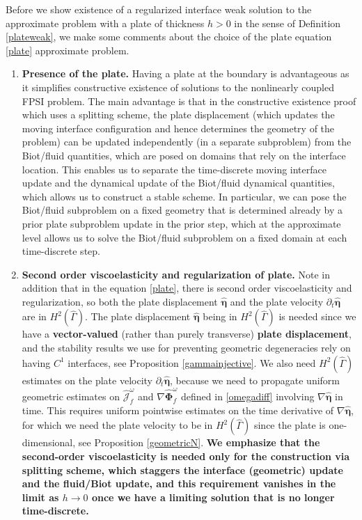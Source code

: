 \documentclass[11pt]{article}
\newcommand{\bd}{\boldsymbol}
\theoremstyle{definition}
\begin{document}
Before we show existence of a regularized interface weak solution to the approximate problem with a plate of thickness $h > 0$ in the sense of Definition \ref{plateweak}, we make some comments about the choice of the plate equation \eqref{plate} approximate problem.
\begin{enumerate}
\item \textbf{Presence of the plate.} Having a plate at the boundary is advantageous as it simplifies constructive existence of solutions to the nonlinearly coupled FPSI problem. The main advantage is that in the constructive existence proof which uses a splitting scheme, the plate displacement (which updates the moving interface configuration and hence determines the geometry of the problem) can be updated independently (in a separate subproblem) from the Biot/fluid quantities, which are posed on domains that rely on the interface location. This enables us to separate the time-discrete moving interface update and the dynamical update of the Biot/fluid dynamical quantities, which allows us to construct a stable scheme. In particular, we can pose the Biot/fluid subproblem on a fixed geometry that is determined already by a prior plate subproblem update in the prior step, which at the approximate level allows us to solve the Biot/fluid subproblem on a fixed domain at each time-discrete step.
\item \textbf{Second order viscoelasticity and regularization of plate.} Note in addition that in the equation \eqref{plate}, there is second order viscoelasticity and regularization, so both the plate displacement $\hat{\bd{\eta}}$ and the plate velocity $\partial_{t}\hat{\bd{\eta}}$ are in $H^{2}(\hat{\Gamma})$. The plate displacement $\hat{\bd{\eta}}$ being in $H^{2}(\hat{\Gamma})$ is needed since we have a \textbf{vector-valued} (rather than purely transverse) \textbf{plate displacement}, and the stability results we use for preventing geometric degeneracies rely on having $C^{1}$ interfaces, see Proposition \ref{gammainjective}. We also need $H^{2}(\hat{\Gamma})$ estimates on the plate velocity $\partial_{t}\hat{\bd{\eta}}$, because we need to propagate uniform geometric estimates on $\hat{\mathcal{J}}^{\omega}_{f}$ and $\nabla \hat{\bd{\Phi}}^{\omega}_{f}$ defined in \eqref{omegadiff} involving $\nabla \hat{\bd{\eta}}$ in time. This requires uniform pointwise estimates on the time derivative of $\nabla \hat{\bd{\eta}}$, for which we need the plate velocity to be in $H^{2}(\hat{\Gamma})$ since the plate is one-dimensional, see Proposition \ref{geometricN}. \textbf{We emphasize that the second-order viscoelasticity is needed only for the construction via splitting scheme, which staggers the interface (geometric) update and the fluid/Biot update, and this requirement vanishes in the limit as $h \to 0$ once we have a limiting solution that is no longer time-discrete.}
\end{enumerate}
\end{document}
